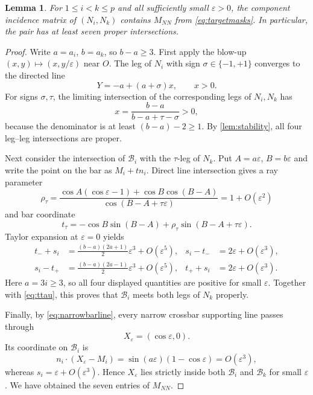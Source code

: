 \documentclass[11pt]{amsart}
\newtheorem{lemma}[lemma]{Lemma}
\theoremstyle{definition}
\newcommand{\B}{\mathcal B}
\newcommand{\eps}{\varepsilon}
\begin{document}
\begin{lemma}\label{lem:NN}
For $1\le i<k\le p$ and all sufficiently small $\eps>0$, the component
incidence matrix of $(N_i,N_k)$ contains $M_{NN}$ from
\eqref{eq:targetmasks}.  In particular, the pair has at least seven proper
intersections.
\end{lemma}

\begin{proof}
Write $a=a_i$, $b=a_k$, so $b-a\ge3$.
First apply the blow-up $(x,y)\mapsto(x,y/\eps)$ near $O$.  The leg of $N_i$
with sign $\sigma\in\{-1,+1\}$ converges to the directed line
\begin{equation}\label{eq:narrowleglimit}
 Y=-a+(a+\sigma)x,\qquad x>0.
\end{equation}
For signs $\sigma,\tau$, the limiting intersection of the corresponding
legs of $N_i,N_k$ has
\[
 x=\frac{b-a}{b-a+\tau-\sigma}>0,
\]
because the denominator is at least $(b-a)-2\ge1$.  By
\cref{lem:stability}, all four leg--leg intersections are proper.

Next consider the intersection of $\B_i$ with the $\tau$-leg of $N_k$.  Put
$A=a\eps$, $B=b\eps$ and write the point on the bar as $M_i+t n_i$.  Direct
line intersection gives a ray parameter
\begin{equation}\label{eq:ttau}
 \rho_\tau=
 \frac{\cos A(\cos\eps-1)+\cos B\cos(B-A)}
      {\cos(B-A+\tau\eps)}
 =1+O(\eps^2)
\end{equation}
and bar coordinate
\begin{equation}\label{eq:qtau}
 t_\tau=-\cos B\sin(B-A)
       +\rho_\tau\sin(B-A+\tau\eps).
\end{equation}
Taylor expansion at $\eps=0$ yields
\begin{align}
 t_{-}+s_i
   &=\frac{(b-a)(2a+1)}{2}\eps^3+O(\eps^5),
 &s_i-t_{-}&=2\eps+O(\eps^3),\label{eq:minusbar}\\
 s_i-t_{+}
   &=\frac{(b-a)(2a-1)}{2}\eps^3+O(\eps^5),
 &t_{+}+s_i&=2\eps+O(\eps^3).\label{eq:plusbar}
\end{align}
Here $a=3i\ge3$, so all four displayed quantities are positive for small
$\eps$.  Together with \eqref{eq:ttau}, this proves that $\B_i$ meets both
legs of $N_k$ properly.

Finally, by \eqref{eq:narrowbarline}, every narrow crossbar supporting line
passes through
\[
 X_\eps=(\cos\eps,0).
\]
Its coordinate on $\B_i$ is
\[
 n_i\mathbin\cdot(X_\eps-M_i)
 =\sin(a\eps)(1-\cos\eps)=O(\eps^3),
\]
whereas $s_i=\eps+O(\eps^3)$.  Hence $X_\eps$ lies strictly inside both
$\B_i$ and $\B_k$ for small $\eps$.  We have obtained the seven entries of
$M_{NN}$.
\end{proof}
\end{document}
